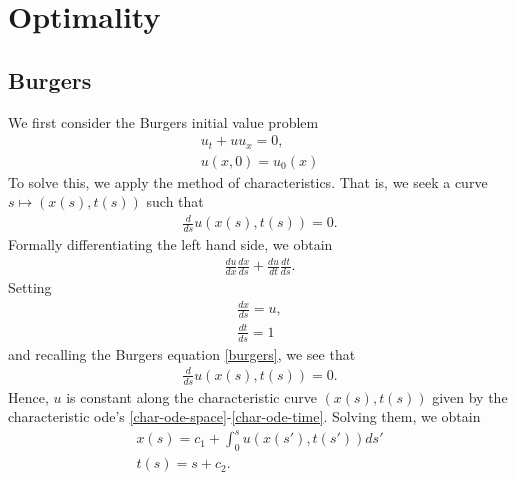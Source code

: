 \documentclass[12pt,reqno]{amsart}
\numberwithin{equation}{section}  %
\numberwithin{figure}{section}
\begin{document}
%
%
%
%
%
%
%
%
%
%
%
%
%
%
%
%
%
%
%
\section{Optimality} 
\label{sec:optimality}
\subsection{Burgers} 
\label{ssec:burgers-opt}

We first consider the Burgers initial value problem
%
%
\begin{gather}
    \label{burgers}
u_{t} + uu_{x} = 0,
\\
\label{burgers-init}
u(x,0) = u_{0}(x)
\end{gather}
%
%
To solve this, we apply the method of characteristics. That is, we seek a curve
$s \mapsto (x(s), t(s))$ such that
%
%
\begin{equation*}
\begin{split}
\frac{d}{ds} u(x(s), t(s)) = 0.
\end{split}
\end{equation*}
%
Formally differentiating the left hand side, we obtain
%
%
\begin{equation*}
\begin{split}
\frac{du}{dx} \frac{dx}{ds} + \frac{du}{dt} \frac{dt}{ds}.
\end{split}
\end{equation*}
%
%
Setting
%
%
\begin{gather}
    \label{char-ode-space}
    \frac{dx}{ds} = u,
    \\
    \label{char-ode-time}
    \frac{dt}{ds}=1
\end{gather}
and recalling the Burgers equation \eqref{burgers}, we see that
%
%
\begin{equation*}
\begin{split}
\frac{d}{ds} u(x(s), t(s)) = 0.
\end{split}
\end{equation*}
%
%
Hence, $u$ is constant along the characteristic curve $(x(s), t(s))$ given by
the characteristic ode's \eqref{char-ode-space}-\eqref{char-ode-time}. Solving
them, we obtain
\begin{gather}
    \label{0j}
    x(s) = c_{1} + \int_{0}^{s} u(x(s'), t(s'))ds'
    \\
    t(s) = s + c_{2}.
\end{gather}
\end{document}
